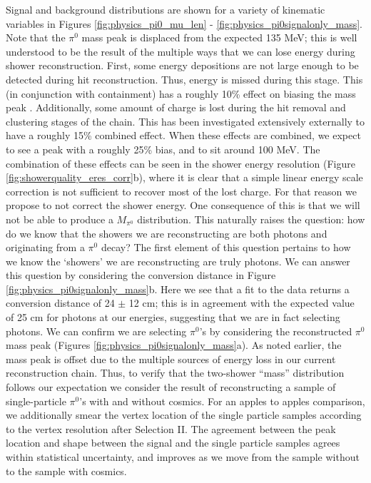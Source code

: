 \documentclass{article}
\begin{document}
Signal and background distributions are shown for a variety of kinematic variables in Figures \ref{fig:physics_pi0_mu_len} - \ref{fig:physics_pi0signalonly_mass}. Note that the $\pi^0$ mass peak is displaced from the expected 135 MeV; this is well understood to be the result of the multiple ways that we can lose energy during shower reconstruction. First, some energy depositions are not large enough to be detected during hit reconstruction. Thus, energy is missed during this stage. This (in conjunction with containment) has a roughly 10\% effect on biasing the mass peak \cite{bib:davidc_hitthresholding}. Additionally, some amount of charge is lost during the hit removal and clustering stages of the chain.  This has been investigated extensively externally \cite{bib:davidc_missingE} to have a roughly 15\% combined effect. When these effects are combined, we expect to see a peak with a roughly 25\% bias, and to sit around 100 MeV. The combination of these effects can be seen in the shower energy resolution (Figure \ref{fig:showerquality_eres_corr}b), where it is clear that a simple linear energy scale correction is not sufficient to recover most of the lost charge. For that reason we propose to not correct the shower energy. One consequence of this is that we will not be able to produce a $M_{\pi^0}$ distribution. This naturally raises the question: how do we know that the showers we are reconstructing are both photons and originating from a $\pi^0$ decay? The first element of this question pertains to how we know the `showers’ we are reconstructing are truly photons. We can answer this question by considering the conversion distance in Figure \ref{fig:physics_pi0signalonly_mass}b.  Here we see that a fit to the data returns a conversion distance of 24 $\pm$ 12 cm; this is in agreement with the expected value of 25 cm for photons at our energies, suggesting that we are in fact selecting photons. We can confirm we are selecting $\pi^0$'s by considering the reconstructed $\pi^0$ mass peak (Figures \ref{fig:physics_pi0signalonly_mass}a).  As noted earlier, the mass peak is offset due to the multiple sources of energy loss in our current reconstruction chain. Thus, to verify that the two-shower “mass” distribution follows our expectation we consider the result of reconstructing a sample of single-particle $\pi^0$’s with and without cosmics. For an apples to apples comparison, we additionally smear the vertex location of the single particle samples according to the vertex resolution after Selection II.  The agreement between the peak location and shape between the signal and the single particle samples agrees within statistical uncertainty, and improves as we move from the sample without to the sample with cosmics. 
\end{document}
